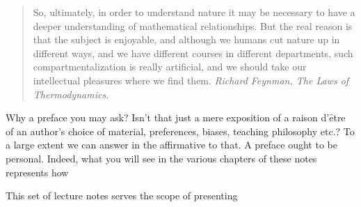 \preface

\begin{quotation}
So, ultimately, in order to understand nature it may be necessary to
have a deeper understanding of mathematical relationships. But the
real reason is that the subject is enjoyable, and although we humans
cut nature up in different ways, and we have different courses in
different departments, such compartmentalization is really artificial,
and we should take our intellectual pleasures where we find them. 
{\em Richard Feynman, The Laws of Thermodynamics.}
\end{quotation}

Why a preface you may ask? Isn't that just a mere exposition of a
raison d'$\mathrm{\hat{e}}$tre of an author's choice of material,
preferences, biases, teaching philosophy etc.?  To a large extent we
can answer in the affirmative to that. A preface ought to be personal.
Indeed, what you will see in the various chapters of these notes
represents how 

 This set of lecture notes serves the scope of presenting 
